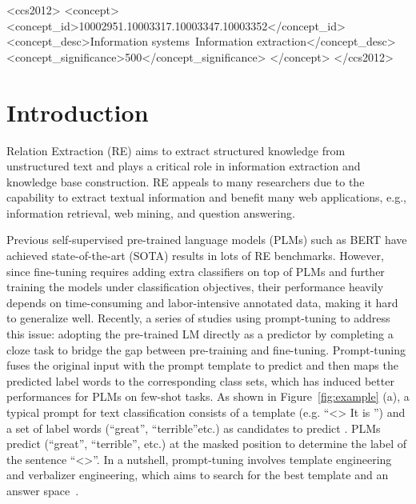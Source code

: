 \documentclass[sigconf]{acmart}
\begin{document}
\begin{CCSXML}
<ccs2012>
<concept>
<concept_id>10002951.10003317.10003347.10003352</concept_id>
<concept_desc>Information systems~Information extraction</concept_desc>
<concept_significance>500</concept_significance>
</concept>
</ccs2012>
\end{CCSXML}






\maketitle



\section{Introduction}
\label{intro}
Relation Extraction (RE) aims to extract structured knowledge from unstructured text and plays a critical role in information extraction and knowledge base construction. 
RE appeals to many researchers \cite{DBLP:conf/emnlp/ZhangZCAM17,DBLP:conf/emnlp/ZhangDSCZC18,alignkg,DBLP:conf/naacl/ZhangDSWCZC19,www20-tom,www21-shen,DBLP:journals/corr/abs-2101-01926} due to the capability to extract textual information and benefit many web applications, e.g., information retrieval, web mining, and question answering. 

Previous self-supervised pre-trained language models (PLMs) such as BERT \cite{DBLP:conf/naacl/DevlinCLT19} have achieved state-of-the-art (SOTA) results in lots of RE benchmarks. 
However, since fine-tuning requires adding extra classifiers on top of PLMs and further training the models under classification objectives, their performance heavily depends on time-consuming and labor-intensive annotated data, making it hard to generalize well.
Recently, a series of studies using prompt-tuning \cite{DBLP:conf/eacl/SchickS21,DBLP:journals/corr/abs-2009-07118,ppt,typeprompt,knowledgeprompt} to address this issue: adopting the pre-trained LM directly as a predictor by completing a cloze task to bridge the gap between pre-training and fine-tuning. 
Prompt-tuning fuses the original input with the prompt template to predict  and then maps the predicted label words to the corresponding class sets, which has induced better performances for PLMs on few-shot tasks.
As shown in Figure~\ref{fig:example} (a), a typical prompt for text classification consists of a template (e.g. ``<> It is  '') and a set of label words (``great'', ``terrible''etc.) as candidates to predict . 
PLMs predict (``great'', ``terrible'', etc.) at the masked position to determine the label of the sentence ``<>''. 
In a nutshell, prompt-tuning involves template engineering and verbalizer engineering, which aims to search for the best template and an answer space~\cite{liu2021pre}.
\end{document}

